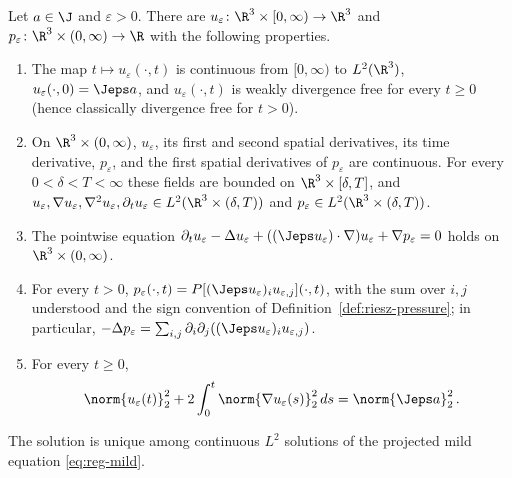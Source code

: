 \documentclass[11pt,reqno]{amsart}
\begin{document}
\begin{theorem}\label{thm:regularised}
Let $a\in\J$ and $\varepsilon>0$. There are
$u_\varepsilon\colon\R^3\times[0,\infty)\to\R^3$ and
$p_\varepsilon\colon\R^3\times(0,\infty)\to\R$ with the following
properties.
\begin{enumerate}[label=(R\arabic*)]
\item The map $t\mapsto u_\varepsilon(\cdot,t)$ is continuous from
  $[0,\infty)$ to $L^2(\R^3)$, $u_\varepsilon(\cdot,0)=\Jeps a$, and
  $u_\varepsilon(\cdot,t)$ is weakly divergence free for every $t\ge0$
  (hence classically divergence free for $t>0$).
\item On $\R^3\times(0,\infty)$, $u_\varepsilon$, its first and second
  spatial derivatives, its time derivative, $p_\varepsilon$, and the first
  spatial derivatives of $p_\varepsilon$ are continuous. For every
  $0<\delta<T<\infty$ these fields are bounded on
  $\R^3\times[\delta,T]$, and
  $u_\varepsilon,\nabla u_\varepsilon,\nabla^2u_\varepsilon,
  \partial_tu_\varepsilon\in L^2(\R^3\times(\delta,T))$ and
  $p_\varepsilon\in L^2(\R^3\times(\delta,T))$.
\item The pointwise equation
  $\partial_tu_\varepsilon-\Delta u_\varepsilon+
  ((\Jeps u_\varepsilon)\cdot\nabla)u_\varepsilon+
  \nabla p_\varepsilon=0$ holds on $\R^3\times(0,\infty)$.
\item For every $t>0$,
  $p_\varepsilon(\cdot,t)=
  P[(\Jeps u_\varepsilon)_i u_{\varepsilon,j}](\cdot,t)$, with the
  sum over $i,j$ understood and the sign convention of
  Definition~\ref{def:riesz-pressure}; in particular,
  $-\Delta p_\varepsilon=\sum_{i,j}\partial_i\partial_j
  ((\Jeps u_\varepsilon)_i u_{\varepsilon,j})$.
\item For every $t\ge0$,
  \begin{equation}\label{eq:reg-energy-equality}
    \norm{u_\varepsilon(t)}_2^2+2\int_0^t
      \norm{\nabla u_\varepsilon(s)}_2^2\,ds
      =\norm{\Jeps a}_2^2\,.
  \end{equation}
\end{enumerate}
The solution is unique among continuous $L^2$ solutions of the projected
mild equation \eqref{eq:reg-mild}.
\end{theorem}
\end{document}
